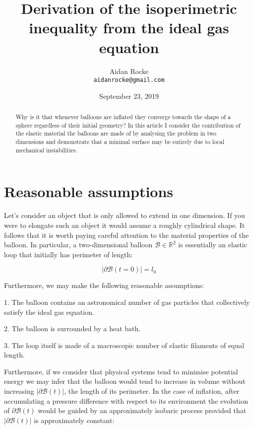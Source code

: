 \documentclass{article}
\title{Derivation of the isoperimetric inequality from the ideal gas equation}
\date{September 23, 2019}
\author{%
  Aidan Rocke\\
  \texttt{aidanrocke@gmail.com} \\
}
\begin{document}
\maketitle

\begin{abstract}
   Why is it that whenever balloons are inflated they converge towards the shape of a sphere regardless of their initial geometry? In this article I consider the contribution of the elastic material the balloons are made of by analysing the problem in two dimensions and demonstrate that a minimal
surface may be entirely due to local mechanical instabilities.
\end{abstract}

\section{Reasonable assumptions}

Let's consider an object that is only allowed to extend in one dimension. If you were to elongate such an object it would assume a roughly cylindrical shape. It follows that it is worth paying careful attention to the material properties of the balloon. In particular, a two-dimensional balloon $\mathcal{B} \in \mathbb{R}^2$ is essentially an elastic loop that initially has perimeter of length:

\begin{equation}
\lvert \partial \mathcal{B}(t=0) \rvert = l_0
\end{equation}

Furthermore, we may make the following reasonable assumptions:

1. The balloon contains an astronomical number of gas particles that collectively satisfy the ideal gas equation.

2. The balloon is surrounded by a heat bath.

3. The loop itself is made of a macroscopic number of elastic filaments of equal length.

Furthermore, if we consider that physical systems tend to minimise potential energy we may infer that the balloon would tend to increase in volume
without increasing $\lvert \partial \mathcal{B}(t) \rvert$, the length of its perimeter. In the case of inflation, after accumulating a pressure difference with respect to its environment the evolution of $\partial \mathcal{B}(t)$
would be guided by an approximately isobaric process provided that $\lvert \partial \mathcal{B}(t) \rvert$ is approximately constant:
\end{document}

